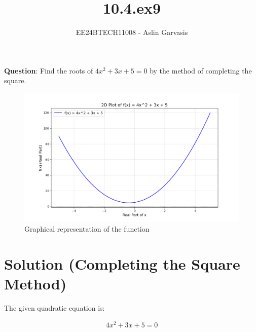 \documentclass[journal]{IEEEtran}
\begin{document}
	

\vspace{3cm}
	
\title{10.4.ex9}
\author{EE24BTECH11008 - Aslin Garvasis}
{\let\newpage\relax\maketitle}
	
\renewcommand{\thefigure}{\theenumi}
\renewcommand{\thetable}{\theenumi}
\setlength{\intextsep}{10pt} %
	

\renewcommand{\thetable}{\theenumi}
	
	
\textbf{Question}:\newline
Find the roots of \( 4x^2 + 3x + 5 = 0 \) by the method of completing the square. \\
	

		\begin{figure}[h!]
		\centering
		\includegraphics[width=\columnwidth]{figs/fig1.png}
			\caption{Graphical representation of the function}
		\label{stemplot}
	\end{figure}
\section*{Solution (Completing the Square Method)}

The given quadratic equation is:

\begin{align}
4x^2 + 3x + 5 = 0
\end{align}
\end{document}

